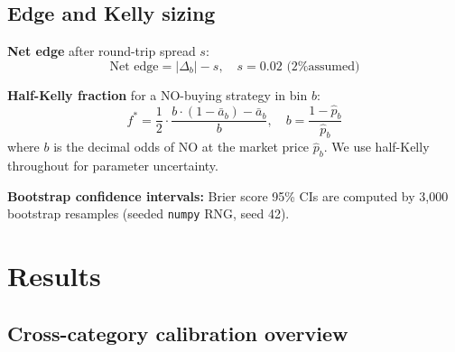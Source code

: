 \documentclass[11pt,a4paper]{article}
\begin{document}
\subsection{Edge and Kelly sizing}

\textbf{Net edge} after round-trip spread $s$:
\begin{equation}
  \text{Net edge} = |\Delta_b| - s, \quad s = 0.02 \text{ (2\% assumed)}
\end{equation}

\textbf{Half-Kelly fraction} for a NO-buying strategy in bin $b$:
\begin{equation}
  f^* = \frac{1}{2} \cdot \frac{b \cdot (1-\bar{a}_b) - \bar{a}_b}{b},
  \quad b = \frac{1 - \hat{p}_b}{\hat{p}_b}
\end{equation}
where $b$ is the decimal odds of NO at the market price $\hat{p}_b$.
We use half-Kelly throughout for parameter uncertainty.

\textbf{Bootstrap confidence intervals:}
Brier score 95\% CIs are computed by 3{,}000 bootstrap resamples (seeded
\texttt{numpy} RNG, seed 42).

\section{Results}

\subsection{Cross-category calibration overview}
\end{document}
